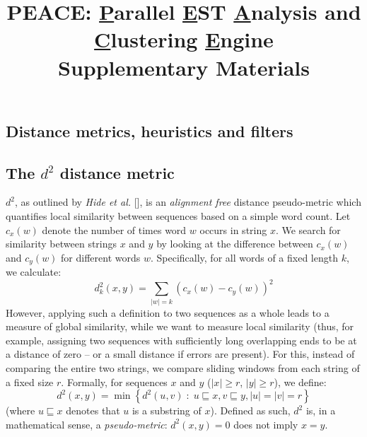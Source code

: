 \documentclass[a4paper,12pt]{article}
\begin{document}
\title{PEACE: {\underline P}arallel {\underline E}ST {\underline A}nalysis
  and {\underline C}lustering {\underline E}ngine \\Supplementary
  Materials}

\date{}

\maketitle  

\begin{appendix}

\renewcommand{\theequation}{S\arabic{equation}}
\renewcommand{\thefigure}{S\arabic{figure}}
\renewcommand{\thetable}{S\arabic{table}}
\setcounter{equation}{0}

\section{Distance metrics, heuristics and filters}

\subsection{The $d^2$ distance metric}
$d^2$, as outlined by {\it Hide et al.} [\cite{Hide94}], is an {\it
  alignment free} distance pseudo-metric which quantifies local
similarity between sequences based on a simple word count.  Let
$c_x(w)$ denote the number of times word $w$ occurs in string $x$.  We
search for similarity between strings $x$ and $y$ by looking at the
difference between $c_x(w)$ and $c_y(w)$ for different words $w$.
Specifically,  for all words of a fixed length $k$, we calculate:
\begin{equation*}
d^2_k(x,y) = \sum_{|w|=k}(c_x(w) - c_y(w))^2
\end{equation*}
However, applying such a definition to two sequences as a whole leads
to a measure of global similarity, while we want to measure local
similarity (thus, for example, assigning two sequences with
sufficiently long overlapping ends to be at a distance of zero -- or a
small distance if errors are present).  For this, instead of comparing
the entire two strings, we compare sliding windows from each string of a fixed
size $r$.  Formally, for sequences $x$ and $y$ ($|x| \geq r$, $|y|
\geq r$), we define:
\begin{equation}
\label{d2def}
d^2(x,y) = 
\min\left\{d^2(u,v) \; : \; u \sqsubseteq x, v \sqsubseteq y, |u|=|v|=r\right\}
\end{equation}
(where $u \sqsubseteq x$ denotes that $u$ is a substring of $x$).
Defined as such, $d^2$ is, in a mathematical sense, a {\it
  pseudo-metric}: $d^2(x,y) = 0$ does not imply $x=y$.


\end{appendix}
\end{document}
